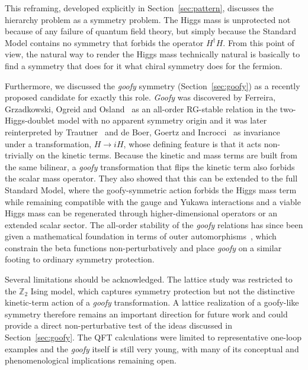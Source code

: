\documentclass[a4paper, 11pt]{article}
\begin{document}
This reframing, developed explicitly in Section~\ref{sec:pattern}, discusses the hierarchy problem as a symmetry problem. The Higgs mass is unprotected not because of any failure of quantum field theory, but simply because the Standard Model contains no symmetry that forbids the operator $H^\dagger H$. From this point of view, the natural way to render the Higgs mass technically natural is basically to find a symmetry that does for it what chiral symmetry does for the fermion.

Furthermore, we discussed the \textit{goofy} symmetry (Section~\ref{sec:goofy}) as a recently proposed candidate for exactly this role. \textit{Goofy} was discovered by Ferreira, Grzadkowski, Ogreid and Osland~\cite{2HDM} as an all-order RG-stable relation in the two-Higgs-doublet model with no apparent symmetry origin and it was later reinterpreted by Trautner~\cite{Trautner_goofy1} and de Boer, Goertz and Incrocci~\cite{goofy2} as invariance under a transformation, $H \to iH$, whose defining feature is that it acts non-trivially on the kinetic terms. Because the kinetic and mass terms are built from the same bilinear, a \textit{goofy} transformation that flips the kinetic term also forbids the scalar mass operator. They also showed that this can be extended to the full Standard Model, where the goofy-symmetric action forbids the Higgs mass term while remaining compatible with the gauge and Yukawa interactions and a viable Higgs mass can be regenerated through higher-dimensional operators or an extended scalar sector. The all-order stability of the \textit{goofy} relations has since been given a mathematical foundation in terms of outer automorphisms~\cite{deBoer_Trautner_Outs}, which constrain the beta functions non-perturbatively and place \textit{goofy} on a similar footing to ordinary symmetry protection.

Several limitations should be acknowledged. The lattice study was restricted to the $\mathbb{Z}_2$ Ising model, which captures symmetry protection but not the distinctive kinetic-term action of a \textit{goofy} transformation. A lattice realization of a goofy-like symmetry therefore remains an important direction for future work and could provide a direct non-perturbative test of the ideas discussed in Section~\ref{sec:goofy}. The QFT calculations were limited to representative one-loop examples and the \textit{goofy} itself is still very young, with many of its conceptual and phenomenological implications remaining open.
\end{document}
